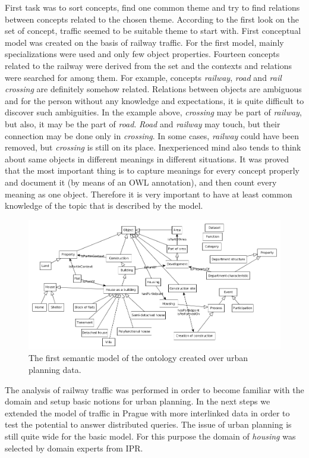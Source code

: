 \documentclass{lncs-template/llncs}
\begin{document}
First task was to sort concepts, find one common theme and try to find relations between concepts related to the chosen theme. According to the first look on the set of concept, traffic seemed to be suitable theme to start with. First conceptual model was created on the basis of railway traffic. For the first model, mainly specializations were used and only few object properties. Fourteen concepts related to the railway were derived from the set and the contexts and relations were searched for among them. For example, concepts \emph{railway}, \emph{road} and \emph{rail crossing} are definitely somehow related. Relations between objects are ambiguous and for the person without any knowledge and expectations, it is quite difficult to discover such ambiguities. In the example above, \emph{crossing} may be part of \emph{railway}, but also, it may be the part of \emph{road}. \emph{Road} and \emph{railway} may touch, but their connection may be done only in \emph{crossing}. In some cases, \emph{railway} could have been removed, but \emph{crossing} is still on its place. Inexperienced mind also tends to think about same objects in different meanings in different situations. It was proved that the most important thing is to capture meanings for every concept properly and document it (by means of an OWL annotation), and then count every meaning as one object. Therefore it is very important to have at least common knowledge of the topic that is described by the model. 

\begin{figure}
 \includegraphics[width=1.0\textwidth]{images/znalostniModel.png}
 \caption{The first semantic model of the ontology created over urban planning data.}\label{fig:model_june}
\end{figure}

The analysis of railway traffic was performed in order to become familiar with the domain and setup basic notions for urban planning. In the next steps we extended the model of traffic in Prague with more interlinked data in order to test the potential to answer distributed queries. The issue of urban planning is still quite wide for the basic model. For this purpose the domain of \emph{housing} was selected by domain experts from IPR.
\end{document}
